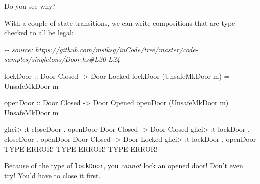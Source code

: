 \documentclass[]{article}
\newenvironment{Shaded}{}{}
\newcommand{\CommentTok}[1]{\textcolor[rgb]{0.38,0.63,0.69}{\textit{#1}}}
\newcommand{\DataTypeTok}[1]{\textcolor[rgb]{0.56,0.13,0.00}{#1}}
\newcommand{\NormalTok}[1]{#1}
\newcommand{\OperatorTok}[1]{\textcolor[rgb]{0.40,0.40,0.40}{#1}}
\newcommand{\OtherTok}[1]{\textcolor[rgb]{0.00,0.44,0.13}{#1}}
\begin{document}
Do you see why?

With a couple of state transitions, we can write compositions that are
type-checked to all be legal:

\begin{Shaded}
\begin{Highlighting}[]
\CommentTok{{-}{-} source: https://github.com/mstksg/inCode/tree/master/code{-}samples/singletons/Door.hs\#L20{-}L24}

\OtherTok{lockDoor ::} \DataTypeTok{Door} \DataTypeTok{\textquotesingle{}Closed} \OtherTok{{-}\textgreater{}} \DataTypeTok{Door} \DataTypeTok{\textquotesingle{}Locked}
\NormalTok{lockDoor (}\DataTypeTok{UnsafeMkDoor}\NormalTok{ m) }\OtherTok{=} \DataTypeTok{UnsafeMkDoor}\NormalTok{ m}

\OtherTok{openDoor ::} \DataTypeTok{Door} \DataTypeTok{\textquotesingle{}Closed} \OtherTok{{-}\textgreater{}} \DataTypeTok{Door} \DataTypeTok{\textquotesingle{}Opened}
\NormalTok{openDoor (}\DataTypeTok{UnsafeMkDoor}\NormalTok{ m) }\OtherTok{=} \DataTypeTok{UnsafeMkDoor}\NormalTok{ m}
\end{Highlighting}
\end{Shaded}

\begin{Shaded}
\begin{Highlighting}[]
\NormalTok{ghci}\OperatorTok{\textgreater{}} \OperatorTok{:}\NormalTok{t closeDoor }\OperatorTok{.}\NormalTok{ openDoor}
\DataTypeTok{Door} \DataTypeTok{\textquotesingle{}Closed} \OtherTok{{-}\textgreater{}} \DataTypeTok{Door} \DataTypeTok{\textquotesingle{}Closed}
\NormalTok{ghci}\OperatorTok{\textgreater{}} \OperatorTok{:}\NormalTok{t lockDoor }\OperatorTok{.}\NormalTok{ closeDoor }\OperatorTok{.}\NormalTok{ openDoor}
\DataTypeTok{Door} \DataTypeTok{\textquotesingle{}Closed} \OtherTok{{-}\textgreater{}} \DataTypeTok{Door} \DataTypeTok{\textquotesingle{}Locked}
\NormalTok{ghci}\OperatorTok{\textgreater{}} \OperatorTok{:}\NormalTok{t lockDoor }\OperatorTok{.}\NormalTok{ openDoor}
\DataTypeTok{TYPE} \DataTypeTok{ERROR}\OperatorTok{!}  \DataTypeTok{TYPE} \DataTypeTok{ERROR}\OperatorTok{!}  \DataTypeTok{TYPE} \DataTypeTok{ERROR}\OperatorTok{!}
\end{Highlighting}
\end{Shaded}

Because of the type of \texttt{lockDoor}, you \emph{cannot} lock an opened door!
Don't even try! You'd have to close it first.
\end{document}
